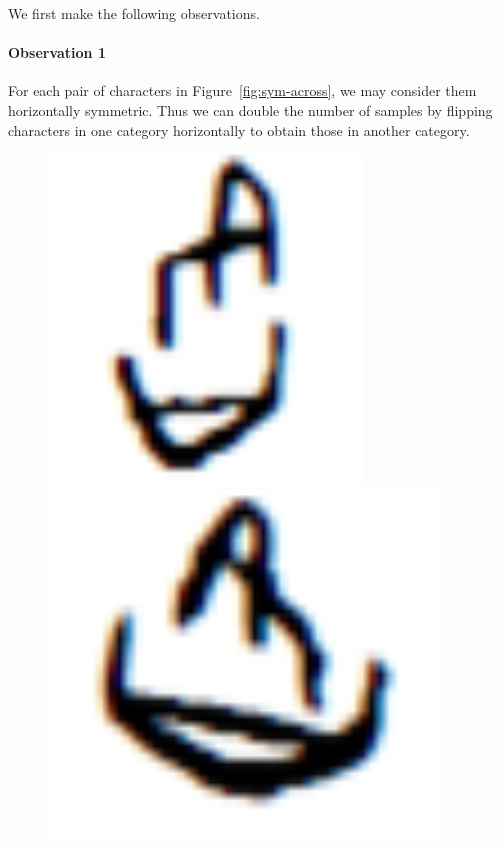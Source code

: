 \documentclass[journal]{IEEEtran}
\begin{document}
We first make the following observations.

\paragraph{Observation 1} For each pair of characters in Figure~\ref{fig:sym-across}, we may consider them horizontally symmetric.
Thus we can double the number of samples by flipping characters in one category horizontally to obtain those in another category.

\begin{figure}[h]
	\centering
	\begin{minipage}{0.2\linewidth}
		\includegraphics[width=0.8\linewidth]{fig/observation-1-1.png}
		\includegraphics[width=0.8\linewidth]{fig/observation-1-2.png}

\end{minipage}
\end{figure}
\end{document}
